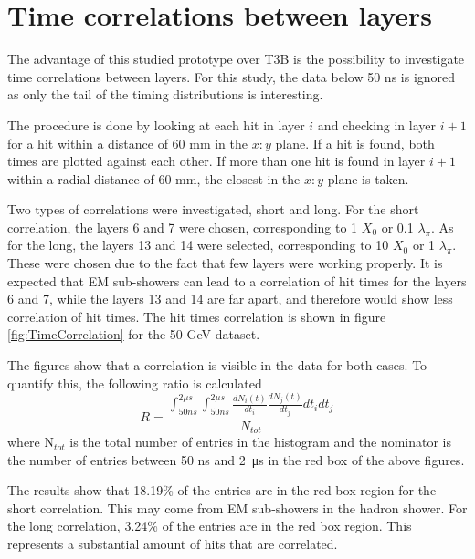 \section{Time correlations between layers}

The advantage of this studied prototype over T3B is the possibility to investigate time correlations between layers. For this study, the data below 50 ns is ignored as only the tail of the timing distributions is interesting.

The procedure is done by looking at each hit in layer $i$ and checking in layer $i+1$ for a hit within a distance of 60 mm in the $x:y$ plane. If a hit is found, both times are plotted against each other. If more than one hit is found in layer $i+1$ within a radial distance of 60 mm, the closest in the $x:y$ plane is taken.

Two types of correlations were investigated, short and long. For the short correlation, the layers 6 and 7 were chosen, corresponding to 1 $X_0$ or 0.1 $\lambda_{\pi}$. As for the long, the layers 13 and 14 were selected, corresponding to 10 $X_0$ or 1 $\lambda_{\pi}$. These were chosen due to the fact that few layers were working properly. It is expected that EM sub-showers can lead to a correlation of hit times for the layers 6 and 7, while the layers 13 and 14 are far apart, and therefore would show less correlation of hit times. The hit times correlation is shown in figure \ref{fig:TimeCorrelation} for the 50 GeV dataset.

The figures show that a correlation is visible in the data for both cases. To quantify this, the following ratio is calculated
\begin{equation}\label{eq:CorrelCalcul}
	R = \frac{\int_{50 ns}^{2 \mu s} \int_{50 ns}^{2 \mu s} \frac{dN_i(t)}{dt_i} \frac{dN_j(t)}{dt_j} dt_i dt_j}{N_{tot}}
\end{equation}
where N$_{tot}$ is the total number of entries in the histogram and the nominator is the number of entries between 50 ns and \SI{2}{\micro\second} in the red box of the above figures.

The results show that 18.19\% of the entries are in the red box region for the short correlation. This may come from EM sub-showers in the hadron shower. For the long correlation, 3.24\% of the entries are in the red box region. This represents a substantial amount of hits that are correlated.

